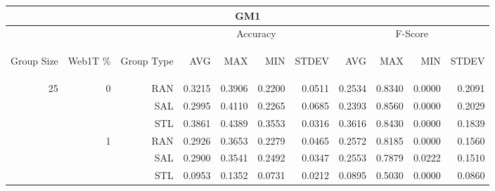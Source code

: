 \begin{center}
\begin{table}[htbp]
\begin{tabular}{ | r | r | r | r | r | r | r | r | r | r | r |}
\hline
\multicolumn{11}{|c|}{GM1}\\
\hline
 & & & \multicolumn{4}{|c|}{Accuracy} & \multicolumn{4}{|c|}{F-Score}\\ \cline{4-11}
\begin{sideways}Group Size\end{sideways} & \begin{sideways}Web1T \%\end{sideways} & \begin{sideways}Group Type\end{sideways} & \begin{sideways}AVG\end{sideways} & \begin{sideways}MAX\end{sideways} & \begin{sideways}MIN\end{sideways} & \begin{sideways}STDEV\end{sideways} & \begin{sideways}AVG\end{sideways} & \begin{sideways}MAX\end{sideways} & \begin{sideways}MIN\end{sideways} & \begin{sideways}STDEV\end{sideways}\\
\hline
\multirow{18}{*}{25}
 & \multirow{3}{*}{0} & RAN & 0.3215 & 0.3906 & 0.2200 & 0.0511 & 0.2534 & 0.8340 & 0.0000 & 0.2091\\ \cline{3-11}
 &   & SAL & 0.2995 & 0.4110 & 0.2265 & 0.0685 & 0.2393 & 0.8560 & 0.0000 & 0.2029\\ \cline{3-11}
 &   & STL & 0.3861 & 0.4389 & 0.3553 & 0.0316 & 0.3616 & 0.8430 & 0.0000 & 0.1839\\ \cline{2-11}
 & \multirow{3}{*}{1} & RAN & 0.2926 & 0.3653 & 0.2279 & 0.0465 & 0.2572 & 0.8185 & 0.0000 & 0.1560\\ \cline{3-11}
 &   & SAL & 0.2900 & 0.3541 & 0.2492 & 0.0347 & 0.2553 & 0.7879 & 0.0222 & 0.1510\\ \cline{3-11}
 &   & STL & 0.0953 & 0.1352 & 0.0731 & 0.0212 & 0.0895 & 0.5030 & 0.0000 & 0.0860\\ \cline{2-11}

\end{tabular}
\end{table}
\end{center}
